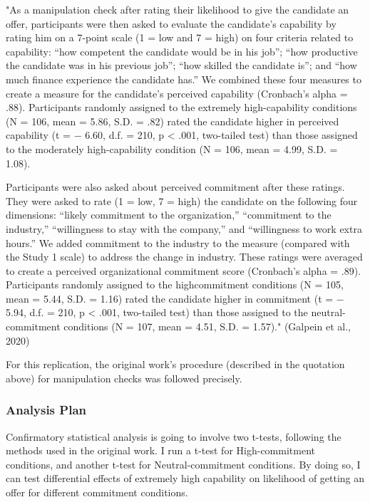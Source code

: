 \documentclass[]{article}
\begin{document}
"As a manipulation check after rating their likelihood to give the
candidate an offer, participants were then asked to evaluate the
candidate's capability by rating him on a 7-point scale (1 = low and 7 =
high) on four criteria related to capability: ``how competent the
candidate would be in his job''; ``how productive the candidate was in
his previous job''; ``how skilled the candidate is''; and ``how much
finance experience the candidate has.'' We combined these four measures
to create a measure for the candidate's perceived capability (Cronbach's
alpha = .88). Participants randomly assigned to the extremely
high-capability conditions (N = 106, mean = 5.86, S.D. = .82) rated the
candidate higher in perceived capability (t = − 6.60, d.f. = 210, p
\textless{} .001, two-tailed test) than those assigned to the moderately
high-capability condition (N = 106, mean = 4.99, S.D. = 1.08).

Participants were also asked about perceived commitment after these
ratings. They were asked to rate (1 = low, 7 = high) the candidate on
the following four dimensions: ``likely commitment to the
organization,'' ``commitment to the industry,'' ``willingness to stay
with the company,'' and ``willingness to work extra hours.'' We added
commitment to the industry to the measure (compared with the Study 1
scale) to address the change in industry. These ratings were averaged to
create a perceived organizational commitment score (Cronbach's alpha =
.89). Participants randomly assigned to the highcommitment conditions (N
= 105, mean = 5.44, S.D. = 1.16) rated the candidate higher in
commitment (t = − 5.94, d.f. = 210, p \textless{} .001, two-tailed test)
than those assigned to the neutral-commitment conditions (N = 107, mean
= 4.51, S.D. = 1.57)." (Galpein et al., 2020)

For this replication, the original work's procedure (described in the
quotation above) for manipulation checks was followed precisely.

\hypertarget{analysis-plan}{%
\subsubsection{Analysis Plan}\label{analysis-plan}}

Confirmatory statistical analysis is going to involve two t-tests,
following the methods used in the original work. I run a t-test for
High-commitment conditions, and another t-test for Neutral-commitment
conditions. By doing so, I can test differential effects of extremely
high capability on likelihood of getting an offer for different
commitment conditions.
\end{document}
